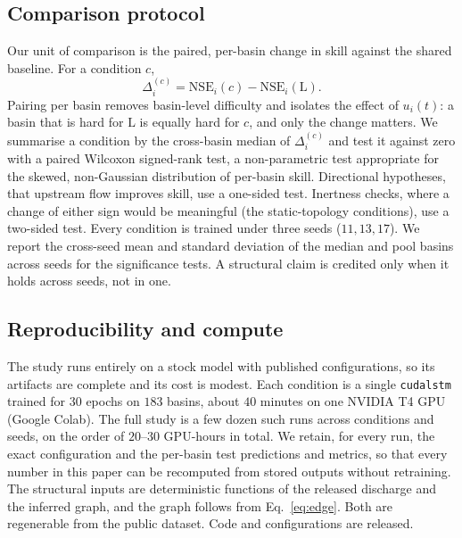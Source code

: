\documentclass[11pt]{article}
\begin{document}
\subsection{Comparison protocol}
\label{sec:protocol-compare}

Our unit of comparison is the paired, per-basin change in skill against the shared baseline. For a
condition $c$,
\begin{equation}
\label{eq:delta}
\Delta_i^{(c)} = \mathrm{NSE}_i(c) - \mathrm{NSE}_i(\mathrm{L}).
\end{equation}
Pairing per basin removes basin-level difficulty and isolates the effect of $u_i(t)$: a basin that is
hard for $\mathrm{L}$ is equally hard for $c$, and only the change matters. We summarise a condition
by the cross-basin median of $\Delta_i^{(c)}$ and test it against zero with a paired Wilcoxon
signed-rank test, a non-parametric test appropriate for the skewed, non-Gaussian distribution
of per-basin skill. Directional hypotheses, that upstream flow improves skill, use a one-sided
test. Inertness checks, where a change of either sign would be meaningful (the static-topology
conditions), use a two-sided test. Every condition is trained under three seeds ($11,13,17$). We report the
cross-seed mean and standard deviation of the median and pool basins across seeds for the
significance tests. A structural claim is credited only when it holds across seeds, not in one.

\subsection{Reproducibility and compute}
\label{sec:protocol-repro}

The study runs entirely on a stock model with published configurations, so its artifacts are
complete and its cost is modest. Each condition is a single \texttt{cudalstm} trained for $30$
epochs on $183$ basins, about $40$ minutes on one NVIDIA T4 GPU (Google Colab). The full study is a
few dozen such runs across conditions and seeds, on the order of $20$--$30$ GPU-hours in total. We
retain, for every run, the exact configuration and the per-basin test predictions and metrics, so
that every number in this paper can be recomputed from stored outputs without retraining. The
structural inputs are deterministic functions of the released discharge and the inferred graph, and
the graph follows from Eq.~\eqref{eq:edge}. Both are regenerable from the public dataset. Code and
configurations are released.
\end{document}
